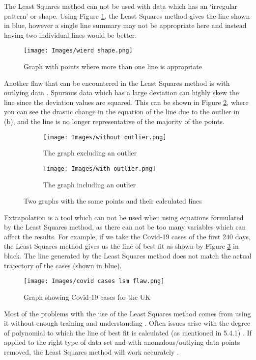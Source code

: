 \documentclass{article}
\begin{document}
The Least Squares method can not be used with data which has an `irregular pattern' or shape. Using Figure \ref{weird}, the Least Squares method gives the line shown in blue, however a single line summary may not be appropriate here and instead having two individual lines would be better.
\begin{figure}[H]\label{weird}
  \centering
  \texttt{[image: Images/wierd shape.png]}
  \caption{Graph with points where more than one line is appropriate}
\end{figure}
Another flaw that can be encountered in the Least Squares method is with outlying data \cite{pitfall}. Spurious data which has a large deviation can highly skew the line since the deviation values are squared. This can be shown in Figure \ref{outlier}, where you can see the drastic change in the equation of the line due to the outlier in (b), and the line is no longer representative of the majority of the points.
\begin{figure}[H]
\centering
\begin{subfigure}{.5\textwidth}
  \centering
  \texttt{[image: Images/without outlier.png]}
  \caption{The graph excluding an outlier}
\end{subfigure}%
\begin{subfigure}{.5\textwidth}
  \centering
  \texttt{[image: Images/with outlier.png]}
  \caption{The graph including an outlier}
\end{subfigure}
\caption{Two graphs with the same points and their calculated lines}
\label{outlier}
\end{figure}
Extrapolation is a tool which can not be used when using equations formulated by the Least Squares method, as there can not be too many variables which can affect the results. For example, if we take the Covid-19 cases of the first 240 days, the Least Squares method gives us the line of best fit as shown by Figure \ref{covid} in black. The line generated by the Least Squares method does not match the actual trajectory of the cases (shown in blue).
\begin{figure}[H]
  \centering
  \texttt{[image: Images/covid cases lsm flaw.png]}
  \caption{Graph showing Covid-19 cases for the UK}
  \label{covid}
\end{figure}

Most of the problems with the use of the Least Squares method comes from using it without enough training and understanding \cite{flaws}. Often issues arise with the degree of polynomial to which the line of best fit is calculated (as mentioned in 5.4.1) \cite{flaws}. If applied to the right type of data set and with anomalous/outlying data points removed, the Least Squares method will work accurately \cite{flaws}.  
\end{document}

